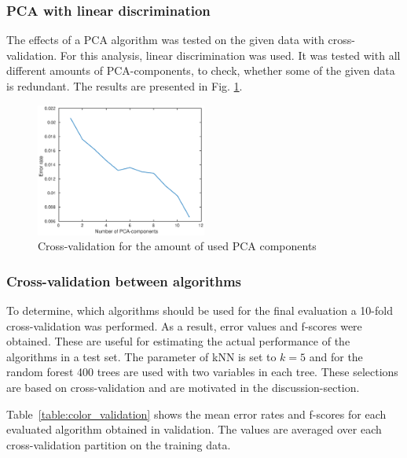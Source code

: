 \documentclass[twoside]{article}
\begin{document}
\begin{multicols}{2}
\subsubsection{PCA with linear discrimination}

The effects of a PCA algorithm was tested on the given data with cross-validation. 
For this analysis, linear discrimination was used. It was tested with all different
amounts of PCA-components, to check, whether some of the given data is redundant.
The results are presented in Fig. \ref{fig:lindiscrpca}.

\begin{figure}[H]
\centering
\includegraphics[width=0.5\textwidth]{lindiskrpca}
\caption{Cross-validation for the amount of used PCA components}
\label{fig:lindiscrpca}
\end{figure}

\subsubsection{Cross-validation between algorithms}

To determine, which algorithms should be used for the final evaluation a 10-fold cross-validation was performed. As a result, error values and f-scores were obtained.
These are useful for estimating the actual performance of the algorithms in a test set. The parameter of 
kNN is set to $k = 5$ and for the random forest 400 trees are used with two variables in each tree. These
selections are based on cross-validation and are motivated in the discussion-section.

Table~\ref{table:color_validation} shows the mean error rates and f-scores for each evaluated algorithm obtained in validation. The values are averaged over each
cross-validation partition on the training data.


\end{multicols}
\end{document}
